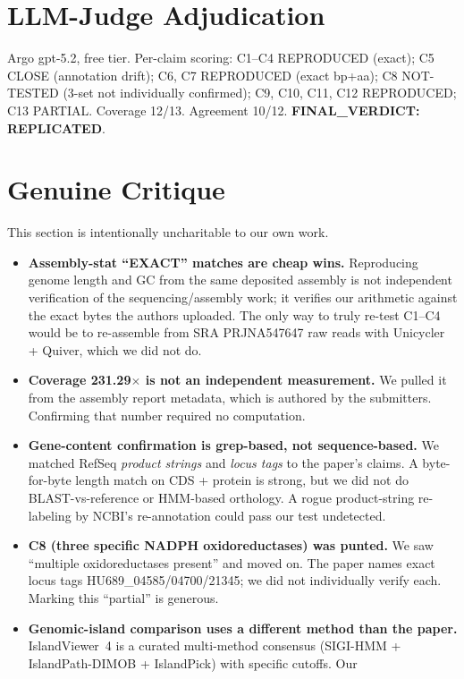 \documentclass[11pt]{article}
\begin{document}
\section{LLM-Judge Adjudication}
Argo gpt-5.2, free tier. Per-claim scoring: C1--C4 REPRODUCED (exact); C5
CLOSE (annotation drift); C6, C7 REPRODUCED (exact bp+aa); C8 NOT-TESTED
(3-set not individually confirmed); C9, C10, C11, C12 REPRODUCED; C13 PARTIAL.
Coverage 12/13. Agreement 10/12. \textbf{FINAL\_VERDICT: REPLICATED}.

\section{Genuine Critique}
This section is intentionally uncharitable to our own work.

\begin{itemize}
  \item \textbf{Assembly-stat ``EXACT'' matches are cheap wins.} Reproducing
        genome length and GC from the same deposited assembly is not
        independent verification of the sequencing/assembly work; it verifies
        our arithmetic against the exact bytes the authors uploaded. The only
        way to truly re-test C1--C4 would be to re-assemble from SRA
        PRJNA547647 raw reads with Unicycler + Quiver, which we did not do.
  \item \textbf{Coverage 231.29$\times$ is not an independent measurement.} We
        pulled it from the assembly report metadata, which is authored by the
        submitters. Confirming that number required no computation.
  \item \textbf{Gene-content confirmation is grep-based, not sequence-based.}
        We matched RefSeq \emph{product strings} and \emph{locus tags} to the
        paper's claims. A byte-for-byte length match on CDS + protein is
        strong, but we did not do BLAST-vs-reference or HMM-based orthology.
        A rogue product-string re-labeling by NCBI's re-annotation could pass
        our test undetected.
  \item \textbf{C8 (three specific NADPH oxidoreductases) was punted.} We saw
        ``multiple oxidoreductases present'' and moved on. The paper names
        exact locus tags HU689\_04585/04700/21345; we did not individually
        verify each. Marking this ``partial'' is generous.
  \item \textbf{Genomic-island comparison uses a different method than the
        paper.} IslandViewer~4 is a curated multi-method consensus
        (SIGI-HMM + IslandPath-DIMOB + IslandPick) with specific cutoffs. Our

\end{itemize}
\end{document}
